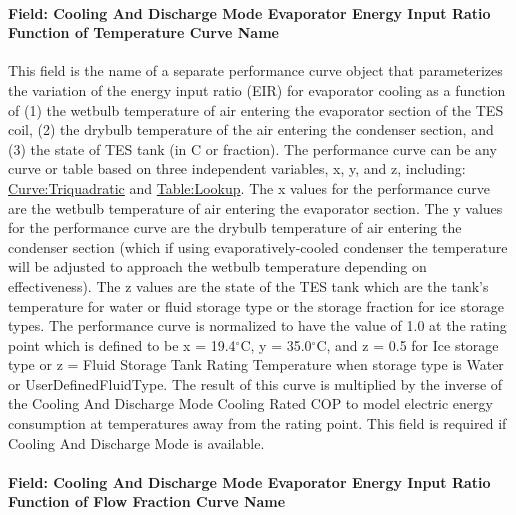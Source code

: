 \paragraph{Field: Cooling And Discharge Mode Evaporator Energy Input Ratio Function of Temperature Curve Name}\label{field-cooling-and-discharge-mode-evaporator-energy-input-ratio-function-of-temperature-curve-name}

This field is the name of a separate performance curve object that parameterizes the variation of the energy input ratio (EIR) for evaporator cooling as a function of (1) the wetbulb temperature of air entering the evaporator section of the TES coil, (2) the drybulb temperature of the air entering the condenser section, and (3) the state of TES tank (in C or fraction). The performance curve can be any curve or table based on three independent variables, x, y, and z, including: \hyperref[curvetriquadratic]{Curve:Triquadratic} and \hyperref[tablelookup]{Table:Lookup}. The x values for the performance curve are the wetbulb temperature of air entering the evaporator section. The y values for the performance curve are the drybulb temperature of air entering the condenser section (which if using evaporatively-cooled condenser the temperature will be adjusted to approach the wetbulb temperature depending on effectiveness). The z values are the state of the TES tank which are the tank's temperature for water or fluid storage type or the storage fraction for ice storage types. The performance curve is normalized to have the value of 1.0 at the rating point which is defined to be x = 19.4$^\circ$C, y = 35.0$^\circ$C, and z = 0.5 for Ice storage type or z = Fluid Storage Tank Rating Temperature when storage type is Water or UserDefinedFluidType. The result of this curve is multiplied by the inverse of the Cooling And Discharge Mode Cooling Rated COP to model electric energy consumption at temperatures away from the rating point. This field is required if Cooling And Discharge Mode is available.

\paragraph{Field: Cooling And Discharge Mode Evaporator Energy Input Ratio Function of Flow Fraction Curve Name}\label{field-cooling-and-discharge-mode-evaporator-energy-input-ratio-function-of-flow-fraction-curve-name}

